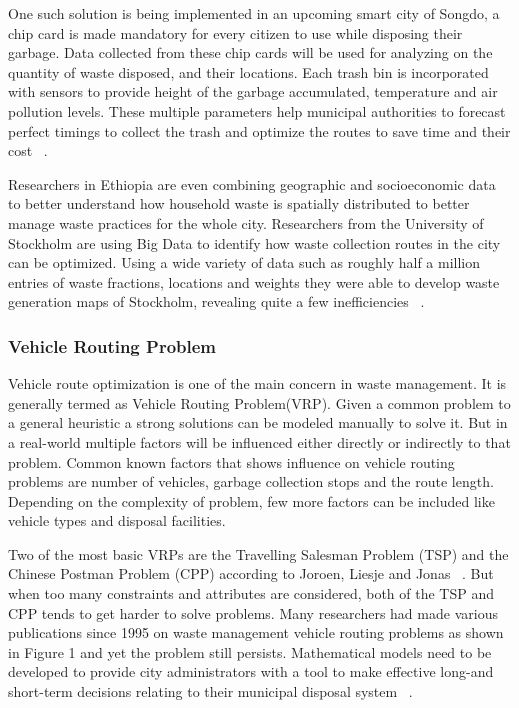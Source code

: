 \documentclass[sigconf]{acmart}
\begin{document}
One such solution is being implemented in an upcoming smart city of Songdo, a chip card is made mandatory for every citizen to use while disposing their garbage. Data collected from these chip cards will be used for analyzing on the quantity of waste disposed, and their locations. Each trash bin is incorporated with sensors to provide height of the garbage accumulated, temperature and air pollution levels. These multiple parameters help municipal authorities to forecast perfect timings to collect the trash and optimize the routes to save time and their cost ~\cite{markvan2016}.

Researchers in Ethiopia are even combining geographic and socioeconomic data to better understand how household waste is spatially distributed to better manage waste practices for the whole city. Researchers from the University of Stockholm are using Big Data to identify how waste collection routes in the city can be optimized. Using a wide variety of data such as roughly half a million entries of waste fractions, locations and weights they were able to develop waste generation maps of Stockholm, revealing quite a few inefficiencies ~\cite{markvan2016}.

\subsubsection{Vehicle Routing Problem}
Vehicle route optimization is one of the main concern in waste management. It is generally termed as Vehicle Routing Problem(VRP). Given a common problem to a general heuristic a strong solutions can be modeled manually to solve it. But in a real-world multiple factors will be influenced either directly or indirectly to that problem. Common known factors that shows influence on vehicle routing problems are number of vehicles, garbage collection stops and the route length. Depending on the complexity of problem, few more factors can be included like vehicle types and disposal facilities. 

Two of the most basic VRPs are the Travelling Salesman Problem (TSP) and the Chinese Postman Problem (CPP) according to Joroen, Liesje and Jonas ~\cite{Beliën2012}. But when too many constraints and attributes are considered, both of the TSP and CPP tends to get harder to solve problems. Many researchers had made various publications since 1995 on waste management vehicle routing problems as shown in Figure 1 and yet the problem still persists. Mathematical models need to be developed to provide city administrators with a tool to make effective long-and short-term decisions relating to their municipal disposal system ~\cite{Bhat1996}. 
\end{document}
